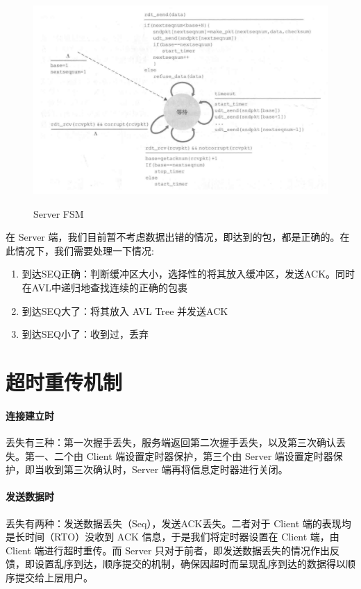 \begin{figure}[!htbp]
    \centering
    \includegraphics[width=.8\textwidth]{figures/SERVER_FSM.png}
    \label{fig:server_fsm}\caption{Server FSM}
  \end{figure}

在 Server 端，我们目前暂不考虑数据出错的情况，即达到的包，都是正确的。在此情况下，我们需要处理一下情况:


\begin{enumerate}
    \item 到达SEQ正确：判断缓冲区大小，选择性的将其放入缓冲区，发送ACK。同时在AVL中递归地查找连续的正确的包裹
    \item 到达SEQ大了：将其放入 AVL Tree 并发送ACK
    \item 到达SEQ小了：收到过，丢弃
\end{enumerate}

\section{超时重传机制}

\paragraph*{连接建立时} 丢失有三种：第一次握手丢失，服务端返回第二次握手丢失，以及第三次确认丢失。第一、二个由 Client 端设置定时器保护，第三个由 Server 端设置定时器保护，即当收到第三次确认时，Server 端再将信息定时器进行关闭。

\paragraph*{发送数据时} 丢失有两种：发送数据丢失（Seq），发送ACK丢失。二者对于 Client 端的表现均是长时间（RTO）没收到 ACK 信息，于是我们将定时器设置在 Client 端，由 Client 端进行超时重传。而 Server 只对于前者，即发送数据丢失的情况作出反馈，即设置乱序到达，顺序提交的机制，确保因超时而呈现乱序到达的数据得以顺序提交给上层用户。

